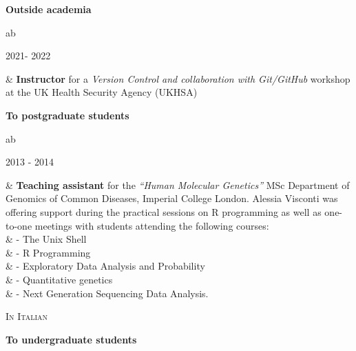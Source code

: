 \documentclass[a4paper,10pt]{article}
\newcommand{\smalltitle}[1]{
	\vspace{0.1cm}
	{\noindent 
	\large \textsc{#1}}
	\vspace{0.1cm}
}
\newenvironment{singletablelist}
{	\vspace{-0.2cm}
	\begin{longtable}[!h]{ab}}{\end{longtable}
}
\newcommand{\stlist}[2]{
	\hspace{-3cm}
	\noindent
	\begin{minipage}{0.24\textwidth}
	\begin{flushright}
	\textsc{#1}
	\end{flushright}
	\end{minipage}
	& #2\\[0.2cm]
}
\begin{document}
\vspace{0.2cm}

\noindent \textbf{Outside academia}


\begin{singletablelist}


\stlist{2021- 2022}{ \textbf{Instructor} for a \emph{Version Control and collaboration with Git/GitHub} workshop at the UK Health Security Agency (UKHSA)}

\end{singletablelist}


\vspace{0.2cm}

\noindent \textbf{To postgraduate students}

\begin{singletablelist}

	\stlist{2013 - 2014}{\textbf{Teaching assistant} for the \emph{``Human Molecular Genetics''} MSc Department of Genomics of Common Diseases, Imperial College London. Alessia Visconti was offering support during the practical sessions on R programming as well as one-to-one meetings with students attending the following courses:\\
							& \hskip1cm - The Unix Shell\\
							& \hskip1cm - R Programming\\
							& \hskip1cm - Exploratory Data Analysis and Probability\\
							& \hskip1cm - Quantitative genetics\\
							& \hskip1cm - Next Generation Sequencing Data Analysis.}				
\end{singletablelist}							


\smalltitle{In Italian}

\vspace{0.2cm}

\noindent \textbf{To undergraduate students}
\end{document}
